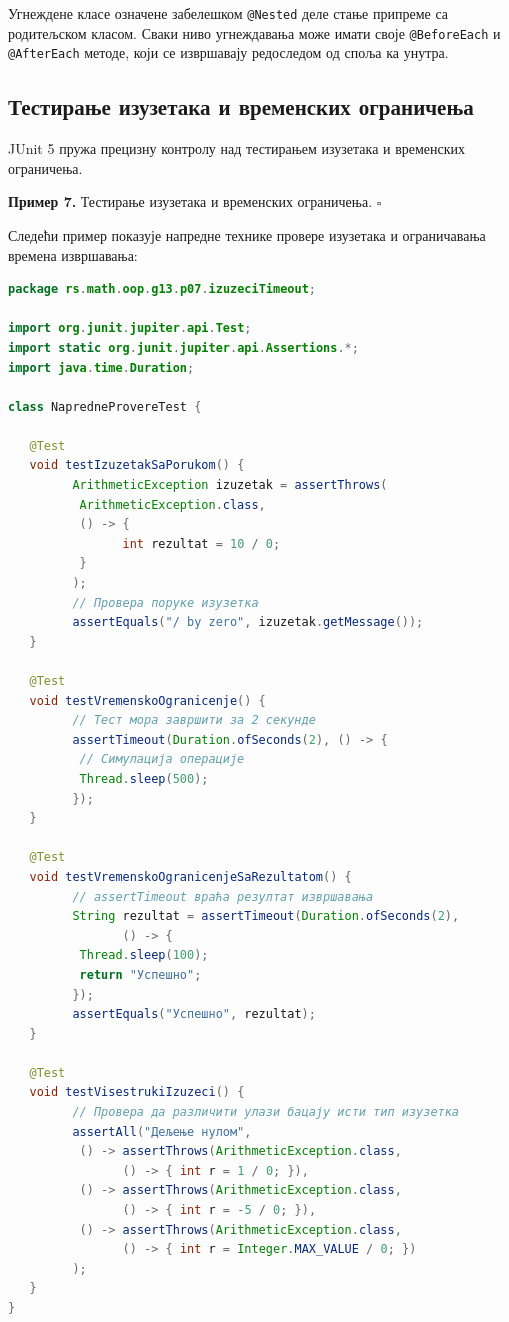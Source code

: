 Угнеждене класе означене забелешком \texttt{@Nested} деле стање припреме са родитељском класом. Сваки ниво угнеждавања може имати своје \texttt{@BeforeEach} и \texttt{@AfterEach} методе, који се извршавају редоследом од споља ка унутра.


\subsection{Тестирање изузетака и временских ограничења}

JUnit 5 пружа прецизну контролу над тестирањем изузетака и временских ограничења.


\bigskip

\noindent \textbf{Пример 7.} Тестирање изузетака и временских ограничења. $\square$

\medskip

Следећи пример показује напредне технике провере изузетака и ограничавања времена извршавања:


\begin{lstlisting}[language=Java]
package rs.math.oop.g13.p07.izuzeciTimeout;
 
import org.junit.jupiter.api.Test;
import static org.junit.jupiter.api.Assertions.*;
import java.time.Duration;
 
class NapredneProvereTest {
 
   @Test
   void testIzuzetakSaPorukom() {
         ArithmeticException izuzetak = assertThrows(
          ArithmeticException.class,
          () -> {
                int rezultat = 10 / 0;
          }
         );
         // Провера поруке изузетка
         assertEquals("/ by zero", izuzetak.getMessage());
   }
 
   @Test
   void testVremenskoOgranicenje() {
         // Тест мора завршити за 2 секунде
         assertTimeout(Duration.ofSeconds(2), () -> {
          // Симулација операције
          Thread.sleep(500);
         });
   }
 
   @Test
   void testVremenskoOgranicenjeSaRezultatom() {
         // assertTimeout враћа резултат извршавања
         String rezultat = assertTimeout(Duration.ofSeconds(2),
                () -> {
          Thread.sleep(100);
          return "Успешно";
         });
         assertEquals("Успешно", rezultat);
   }
 
   @Test
   void testVisestrukiIzuzeci() {
         // Провера да различити улази бацају исти тип изузетка
         assertAll("Дељење нулом",
          () -> assertThrows(ArithmeticException.class,
                () -> { int r = 1 / 0; }),
          () -> assertThrows(ArithmeticException.class,
                () -> { int r = -5 / 0; }),
          () -> assertThrows(ArithmeticException.class,
                () -> { int r = Integer.MAX_VALUE / 0; })
         );
   }
}
\end{lstlisting}


